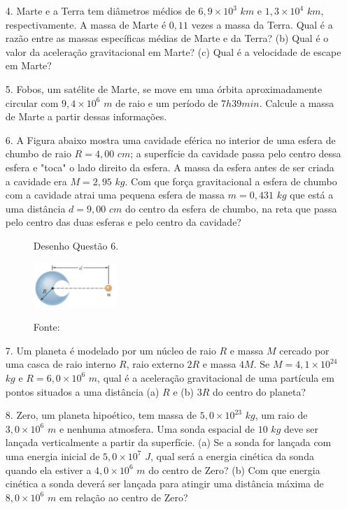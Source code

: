 \begin{itemize}
    \item[4.] \textbf{\cite{Halliday2009vol2}} Marte e a Terra tem diâmetros médios de $6,9 \times 10^3$ $km$ e $1,3 \times 10^4$ $km$, respectivamente. A massa de Marte é $0,11$ vezes a massa da Terra. Qual é a razão entre as massas específicas médias de Marte e da Terra? (b) Qual é o valor da aceleração gravitacional em Marte? (c) Qual é a velocidade de escape em Marte?

    \item[5.] \textbf{\cite{Halliday2009vol2}} Fobos, um satélite de Marte, se move em uma órbita aproximadamente circular com $9,4 \times 10^6$ $m$ de raio e um período de $7h39min$. Calcule a massa de Marte a partir dessas informações.

    \item[6.] \textbf{\cite{Halliday2009vol2}} A Figura abaixo mostra uma cavidade eférica no interior de uma esfera de chumbo de raio $R=4,00$ $cm$; a superfície da cavidade passa pelo centro dessa esfera e "toca" o lado direito da esfera. A massa da esfera antes de ser criada a cavidade era $M=2,95$ $kg$. Com que força gravitacional a esfera de chumbo com a cavidade atrai uma pequena esfera de massa $m=0,431$ $kg$ que está a uma distância $d=9,00$ $cm$ do centro da esfera de chumbo, na reta que passa pelo centro das duas esferas e pelo centro da cavidade?

\begin{figure}[H]
\begin{center}
\caption*{Desenho Questão 6.}
\includegraphics[width=0.3\textwidth]{fig/orp2l1q6.png}
\label{fig:ORP2q6}
\caption*{Fonte: }
\end{center}
\end{figure}

    \item[7.] \textbf{\cite{Halliday2009vol2}} Um planeta é modelado por um núcleo de raio $R$ e massa $M$ cercado por uma casca de raio interno $R$, raio externo $2R$ e massa $4M$. Se $M= 4,1 \times 10^{24}$ $kg$ e $R = 6,0 \times 10^6$ $m$, qual é a aceleração gravitacional de uma partícula em pontos situados a uma distância (a) $R$ e (b) $3R$ do centro do planeta?

    \item[8.] \textbf{\cite{Halliday2009vol2}} Zero, um planeta hipoético, tem massa de $5,0 \times 10^{23}$ $kg$, um raio de $3,0 \times 10^6$ $m$ e nenhuma atmosfera. Uma sonda espacial de $10$ $kg$ deve ser lançada verticalmente a partir da superfície. (a) Se a sonda for lançada com uma energia inicial de $5,0 \times 10^7$ $J$, qual será a energia cinética da sonda quando ela estiver a $4,0 \times 10^6$ $m$ do centro de Zero? (b) Com que energia cinética a sonda deverá ser lançada para atingir uma distância máxima de $8,0 \times 10^6$ $m$ em relação ao centro de Zero?


\end{itemize}
